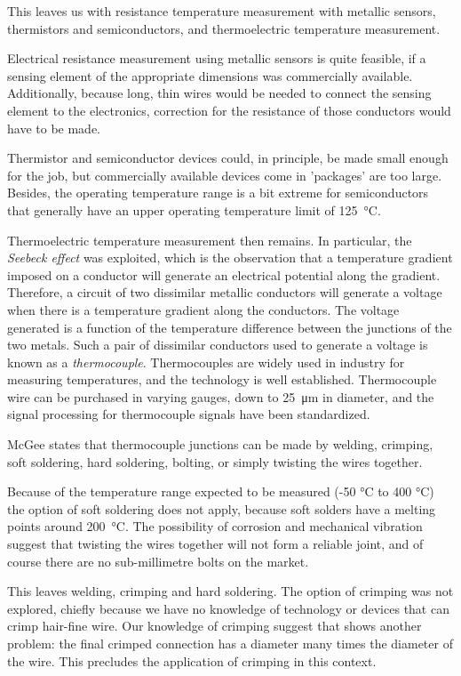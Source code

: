 This leaves us with resistance temperature measurement with metallic sensors,
thermistors and semiconductors, and thermoelectric temperature measurement.

Electrical resistance measurement using metallic sensors is quite feasible, if a
sensing element of the appropriate dimensions was commercially available. Additionally,
because long, thin wires would be needed to connect the sensing element to the
electronics, correction for the resistance of those conductors would have to be made.

Thermistor and semiconductor devices could, in principle, be made small enough
for the job, but commercially available devices come in 'packages' are too
large. Besides, the operating temperature range is a bit extreme for
semiconductors that generally have an upper operating temperature limit of
\SI{125}{\celsius}.

Thermoelectric temperature measurement then remains. In particular, the
\textit{Seebeck effect} was exploited, which is the observation that a
temperature gradient imposed on a conductor will generate an electrical
potential along the gradient. Therefore, a circuit of two dissimilar metallic
conductors will generate a voltage when there is a temperature gradient along
the conductors. The voltage generated is a function of the temperature
difference between the junctions of the two metals. Such a pair of dissimilar
conductors used to generate a voltage is known as a \textit{thermocouple}.
Thermocouples are widely used in industry for measuring temperatures, and the
technology is well established. Thermocouple wire can be purchased in varying
gauges, down to \SI{25}{\micro\metre} in diameter, and the signal processing for
thermocouple signals have been standardized.

McGee \autocite{McGee1988} states that thermocouple junctions can be made by
welding, crimping, soft soldering, hard soldering, bolting, or simply twisting
the wires together.

Because of the temperature range expected to be measured ({-}50 \si{\celsius} to
400 \si{\celsius}) the option of soft soldering does not apply, because soft
solders have a melting points around \SI{200}{\celsius}. The possibility of
corrosion and mechanical vibration suggest that twisting the wires together
will not form a reliable joint, and of course there are no sub-millimetre bolts
on the market.

This leaves welding, crimping and hard soldering. The option of crimping was not
explored, chiefly because we have no knowledge of technology or devices that can
crimp hair-fine wire. Our knowledge of crimping suggest that shows another
problem: the final crimped connection has a diameter many times the diameter of
the wire. This precludes the application of crimping in this context.

